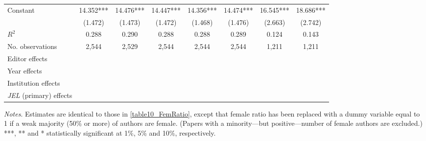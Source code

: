 \begin{table}
\begin{adjustwidth}{-0.085cm}{}
\begin{threeparttable}
\begin{tabular}{p{2.64cm}SSSSSSS}
            Constant                      &      14.352***&      14.476***&      14.447***&      14.356***&      14.474***&      16.545***&      18.686***\\
                                          &     (1.472)   &     (1.473)   &     (1.472)   &     (1.468)   &     (1.476)   &     (2.663)   &     (2.742)   \\
            \midrule
            \(R^2\)                       &       0.288   &       0.290   &       0.288   &       0.288   &       0.289   &       0.124   &       0.143   \\
            No. observations              &       2,544   &       2,529   &       2,544   &       2,544   &       2,544   &       1,211   &       1,211   \\
            \midrule
            Editor effects        &           {}   &           {}   &           {}   &           {}   &           {}   &           {}   &           {}   \\
            Year effects                  &           {}   &           {}   &           {}   &           {}   &           {}   &           {}   &           {}   \\
            Institution effects           &           {}   &           {}   &           {}   &           {}   &           {}   &           {}   &           {}   \\
            \textit{JEL} (primary) effects&               &               &               &               &               &               &           {}   \\
            \bottomrule
        \end{tabular}
        \begin{tablenotes}
            \tiny
            \item \textit{Notes}. Estimates are identical to those in \autoref{table10_FemRatio}, except that female ratio has been replaced with a dummy variable equal to 1 if a weak majority (50\% or more) of authors are female. (Papers with a minority---but positive---number of female authors are excluded.) ***, ** and * statistically significant at 1\%, 5\% and 10\%, respectively.
        \end{tablenotes}
    \end{threeparttable}
    \end{adjustwidth}
\end{table}